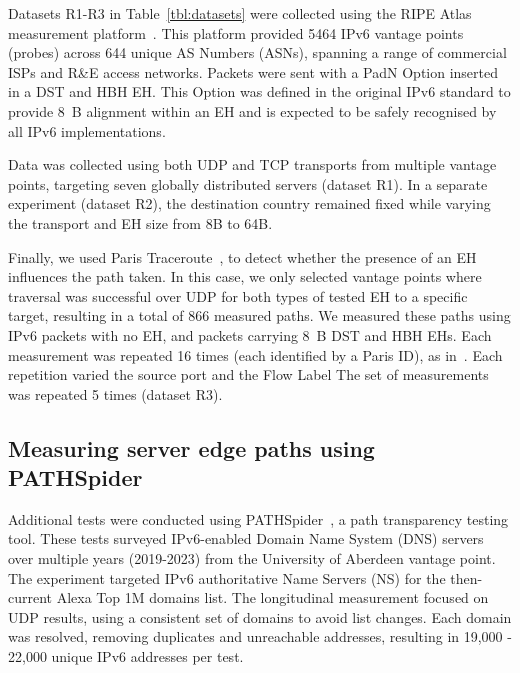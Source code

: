 \documentclass[conference]{IEEEtran}
\begin{document}
Datasets R1-R3 in Table~\ref{tbl:datasets} were collected using the RIPE Atlas
measurement platform~\cite{bajpai2015lessons}.  This platform provided 5464
IPv6 vantage points (probes) across 644 unique AS Numbers (ASNs), spanning a
range of commercial ISPs and R\&E access networks.  
Packets were sent with a PadN Option inserted in a DST and HBH EH. This Option
was defined in the original IPv6 standard to provide 8~B alignment within an EH
and is expected to be safely recognised by all IPv6 implementations.  

Data was collected using both UDP and TCP transports from multiple vantage
points, targeting seven globally distributed servers (dataset R1).  In a
separate experiment (dataset R2), the destination country remained fixed while
varying the transport and EH size from 8B to 64B.


Finally, we used Paris Traceroute~\cite{augustin2006avoiding}, to detect
whether the presence of an EH influences the path taken. In this case, we only
selected vantage points where traversal was successful over UDP for both types
of tested EH to a specific target, resulting in a total of 866 measured paths.
We measured these paths using IPv6 packets with no EH, and packets carrying 8~B
DST and HBH EHs. Each measurement was repeated 16 times (each identified by  a
Paris ID), as in~\cite{augustin2006avoiding}. Each repetition varied the source
port and the Flow Label  The set of  measurements was repeated 5 times (dataset
R3).

\subsection{Measuring server edge paths using PATHSpider}
\label{sec:pathspider-methodology}

Additional tests were conducted using
PATHSpider~\cite{learmonth2016pathspider}, a path transparency testing tool.
These tests surveyed IPv6-enabled Domain Name System (DNS) servers over
multiple years (2019-2023) from the University of Aberdeen vantage point.
The experiment targeted IPv6 authoritative Name Servers (NS) for the
then-current Alexa Top 1M domains list. The longitudinal measurement focused on
UDP results, using a consistent set of domains to avoid list changes. Each
domain was resolved, removing duplicates and unreachable addresses, resulting
in 19,000 - 22,000 unique IPv6 addresses per test.
\end{document}
